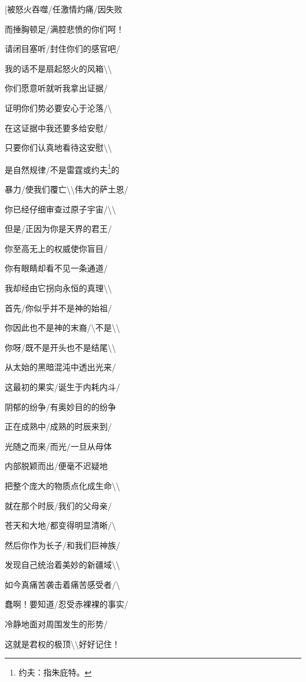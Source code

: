\documentclass[AutoFakeBold=true]{book}
\begin{document}
{\heiti [被怒火吞噬/任激情灼痛/因失败

而捶胸顿足/满腔悲愤的你们呵！

请闭目塞听/封住你们的感官吧/

我的话不是扇起怒火的风箱\textbackslash\textbackslash

你们愿意听就听我拿出证据/

证明你们势必要安心于沦落/\textbackslash

在这证据中我还要多给安慰/

只要你们认真地看待这安慰\textbackslash\textbackslash

是自然规律/不是雷霆或约夫\footnote{约夫：指朱庇特。}的

暴力/使我们覆亡\textbackslash\textbackslash 伟大的萨土恩/

你已经仔细审查过原子宇宙/\textbackslash\textbackslash

但是/正因为你是天界的君王/

你至高无上的权威使你盲目/

你有眼睛却看不见一条通道/

我却经由它拐向永恒的真理\textbackslash\textbackslash

首先/你似乎并不是神的始祖/

你因此也不是神的末裔/\textbackslash 不是\textbackslash\textbackslash

你呀/既不是开头也不是结尾\textbackslash\textbackslash

从太始的黑暗混沌中透出光来/

这最初的果实/诞生于内耗内斗/

阴郁的纷争/有奥妙目的的纷争

正在成熟中/成熟的时辰来到/

光随之而来/而光/一旦从母体

内部脱颖而出/便毫不迟疑地

把整个庞大的物质点化成生命\textbackslash\textbackslash

就在那个时辰/我们的父母亲/

苍天和大地/都变得明显清晰/\textbackslash

然后你作为长子/和我们巨神族/

发现自己统治着美妙的新疆域\textbackslash\textbackslash

如今真痛苦袭击着痛苦感受者/\textbackslash

蠢啊！要知道/忍受赤裸裸的事实/

冷静地面对周围发生的形势/

这就是君权的极顶\textbackslash\textbackslash 好好记住！

}
\end{document}

